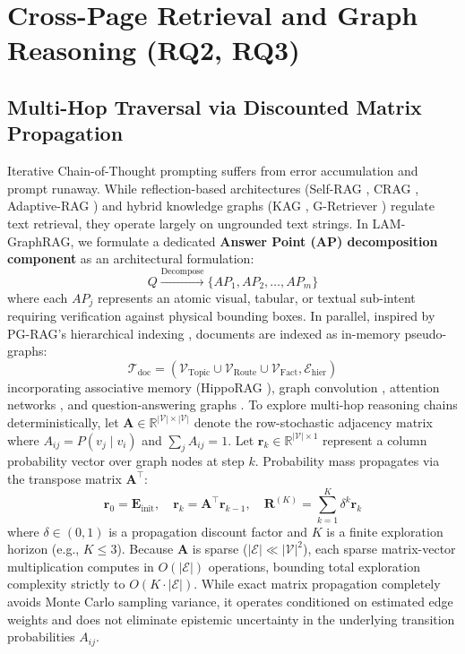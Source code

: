 \documentclass[conference,a4paper]{IEEEtran}
\begin{document}
\section{Cross-Page Retrieval and Graph Reasoning (RQ2, RQ3)}

\subsection{Multi-Hop Traversal via Discounted Matrix Propagation}
Iterative Chain-of-Thought prompting \cite{trivedi2023} suffers from error accumulation and prompt runaway. While reflection-based architectures (Self-RAG \cite{asai2024selfrag}, CRAG \cite{yan2024crag}, Adaptive-RAG \cite{jeong2024adaptiverag}) and hybrid knowledge graphs (KAG \cite{liang2024kag}, G-Retriever \cite{he2024gretriever}) regulate text retrieval, they operate largely on ungrounded text strings. In LAM-GraphRAG, we formulate a dedicated \textbf{Answer Point (AP) decomposition component} as an architectural formulation:
\begin{equation}
Q \xrightarrow{\text{Decompose}} \{AP_1, AP_2, \dots, AP_m\}
\label{eq:ap_decomp}
\end{equation}
where each $AP_j$ represents an atomic visual, tabular, or textual sub-intent requiring verification against physical bounding boxes. In parallel, inspired by PG-RAG's hierarchical indexing \cite{niu2026}, documents are indexed as in-memory pseudo-graphs:
\begin{equation}
\mathcal{T}_{\text{doc}} = (\mathcal{V}_{\text{Topic}} \cup \mathcal{V}_{\text{Route}} \cup \mathcal{V}_{\text{Fact}}, \mathcal{E}_{\text{hier}})
\label{eq:pg_rag_tree}
\end{equation}
incorporating associative memory (HippoRAG \cite{gutierrez2024hipporag}), graph convolution \cite{kipf2017}, attention networks \cite{velickovic2018}, and question-answering graphs \cite{yasunaga2021, shen2026rar}. To explore multi-hop reasoning chains deterministically, let $\mathbf{A} \in \mathbb{R}^{|\mathcal{V}| \times |\mathcal{V}|}$ denote the row-stochastic adjacency matrix where $A_{ij} = P(v_j \mid v_i)$ and $\sum_j A_{ij} = 1$. Let $\mathbf{r}_k \in \mathbb{R}^{|\mathcal{V}| \times 1}$ represent a column probability vector over graph nodes at step $k$. Probability mass propagates via the transpose matrix $\mathbf{A}^\top$:
\begin{equation}
\mathbf{r}_0 = \mathbf{E}_{\text{init}}, \quad \mathbf{r}_k = \mathbf{A}^\top \mathbf{r}_{k-1}, \quad \mathbf{R}^{(K)} = \sum_{k=1}^K \delta^k \mathbf{r}_k
\label{eq:matrix_walk}
\end{equation}
where $\delta \in (0, 1)$ is a propagation discount factor and $K$ is a finite exploration horizon (e.g., $K \le 3$). Because $\mathbf{A}$ is sparse ($|\mathcal{E}| \ll |\mathcal{V}|^2$), each sparse matrix-vector multiplication computes in $O(|\mathcal{E}|)$ operations, bounding total exploration complexity strictly to $O(K \cdot |\mathcal{E}|)$. While exact matrix propagation completely avoids Monte Carlo sampling variance, it operates conditioned on estimated edge weights and does not eliminate epistemic uncertainty in the underlying transition probabilities $A_{ij}$.
\end{document}
